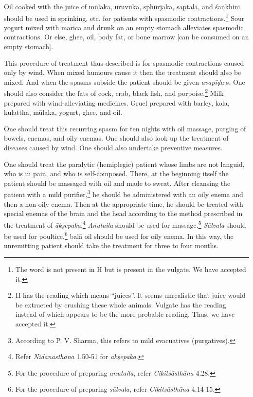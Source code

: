 \begin{translation}
\begin{tt}
Oil cooked with the juice of \gls{mūlaka}, \gls{uruvūka},
\gls{sphūrjaka}, \gls{saptalā}, and \gls{śaṅkhinī} should be used in
sprinking, etc. for patients with spasmodic contractions.\footnote{The
    word  is not present in H but is present in the vulgate.
    We have accepted it.} Sour yogurt mixed with \gls{marica} and drunk on
    an empty stomach alleviates spasmodic contractions. Or else, ghee,
    oil, body fat, or bone marrow [can be consumed on an empty stomach].

This procedure of treatment thus described is for spasmodic
contractions caused only by wind. When mixed humours cause it then the
treatment should also be mixed. And when the spasms subside the
patient should be given \textit{avapīḍa}-s. One should also consider
the fats of cock, crab, black fish, and porpoise.\footnote{H has the
    reading  which means \enquote{juices}. It seems unrealistic
    that juice would be extracted by crushing these whole animals. Vulgate
    has the reading  instead of  which appears to be
    the more probable reading. Thus, we have accepted it.} Milk prepared
    with wind-alleviating medicines. Gruel prepared with barley,
    \gls{kola}, \gls{kulattha}, \gls{mūlaka}, yogurt, ghee, and oil.

One should treat this recurring spasm for ten nights with oil massage,
purging of bowels, enemas, and oily enemas. One should also look up
the treatment of diseases caused by wind. One should also undertake
preventive measures.

\item[19]

One should treat the paralytic (hemiplegic) patient whose limbs are
not languid, who is in pain, and who is self-composed. There, at the
beginning itself the patient should be massaged with oil and made to
sweat. After cleansing the patient with a mild
purifier,\footnote{According to P. V. Sharma, this refers to mild
    evacuatives (purgatives).} he should be administered with an oily
    enema and then a non-oily enema. Then at the appropriate time, he
    should be treated with special enemas of the brain and the head
    according to the method prescribed in the treatment of
    \textit{ākṣepaka}.\footnote{Refer \textit{Nidānasthāna} 1.50-51 for
        \textit{ākṣepaka}.} \textit{Anutaila} should be used for
        massage.\footnote{For the procedure of preparing \textit{anutaila},
            refer \textit{Cikitsāsthāna} 4.28.} \textit{Sālvala} should be used
            for poultice.\footnote{For the procedure of preparing
                \textit{sālvala}, refer \textit{Cikitsāsthāna} 4.14-15.} \gls{balā}
                oil should be used for oily enema. In this way, the unremitting patient should take the
                treatment for three to four months.


\end{tt}
\end{translation}
